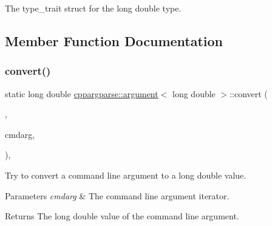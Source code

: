 The type\+\_\+trait struct for the long double type. 

\subsection{Member Function Documentation}
\mbox{\label{structcppargparse_1_1argument_3_01long_01double_01_4_a442a97b13effc88aae98a72fc754b912}} 
\subsubsection{\texorpdfstring{convert()}{convert()}}
{\footnotesize\ttfamily static long double \hyperlink{structcppargparse_1_1argument}{cppargparse\+::argument}$<$ long double $>$\+::convert (\begin{DoxyParamCaption}\item[{const types\+::\+Command\+Line\+\_\+t \&}]{,  }\item[{const types\+::\+Command\+Line\+Argument\+\_\+t \&}]{cmdarg,  }\item[{const types\+::\+Command\+Line\+Arguments\+Map\+\_\+t \&}]{ }\end{DoxyParamCaption})\hspace{0.3cm}{\ttfamily [inline]}, {\ttfamily [static]}}



Try to convert a command line argument to a long double value. 


\begin{DoxyParams}{Parameters}
{\em cmdarg} & The command line argument iterator.\\
\hline
\end{DoxyParams}
\begin{DoxyReturn}{Returns}
The long double value of the command line argument. 
\end{DoxyReturn}
\mbox{\label{structcppargparse_1_1argument_3_01long_01double_01_4_a82796643d277f58f8b65cd9552c1f598}} 
